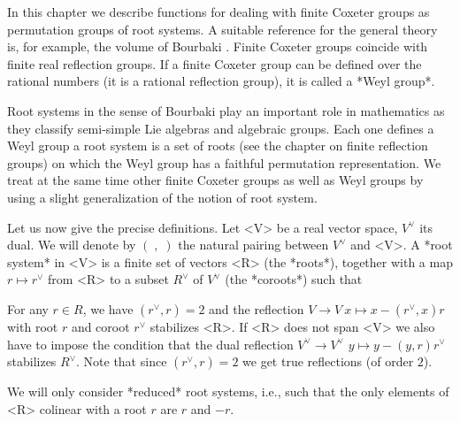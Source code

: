 
In  this  chapter  we  describe  functions  for dealing with finite Coxeter
groups  as permutation groups of root systems. A suitable reference for the
general theory is, for example, the volume of Bourbaki \cite{Bou68}. Finite
Coxeter  groups coincide  with finite  real reflection  groups. If a finite
Coxeter  group can be defined  over the rational numbers  (it is a rational
reflection group), it is called a *Weyl group*.

Root systems in the sense of Bourbaki play an important role in mathematics
as  they classify semi-simple  Lie algebras and  algebraic groups. Each one
defines  a Weyl group\: a root system is a set of roots (see the chapter on
finite   reflection  groups)  on  which  the  Weyl  group  has  a  faithful
permutation  representation. We treat at the same time other finite Coxeter
groups  as well  as Weyl  groups by  using a  slight generalization  of the
notion of root system.

Let  us now give the  precise definitions. Let <V>  be a real vector space,
$V^\vee$  its dual. We will denote by $(\;,\;)$ the natural pairing between
$V^\vee$  and <V>. A  *root system* in  <V> is a  finite set of vectors <R>
(the  *roots*), together with a map $r\mapsto  r^\vee$ from <R> to a subset
$R^\vee$ of $V^\vee$ (the *coroots*) such that\:

For  any  $r\in  R$,  we  have  $(r^\vee,r)=2$ and the reflection $V\to V\:
x\mapsto x- (r^\vee,x) r$ with root $r$ and coroot $r^\vee$ stabilizes <R>.
If <R> does not span <V> we also have to impose the condition that the dual
reflection   $V^\vee  \rightarrow  V^\vee$\:  $y  \mapsto  y  -(y,r)r^\vee$
stabilizes $R^\vee$. Note that since $(r^\vee,r)=2$ we get true reflections
(of order $2$).

We will only  consider *reduced* root systems, i.e., such  that the only
elements of <R> colinear with a root $r$ are $r$ and $-r$.

